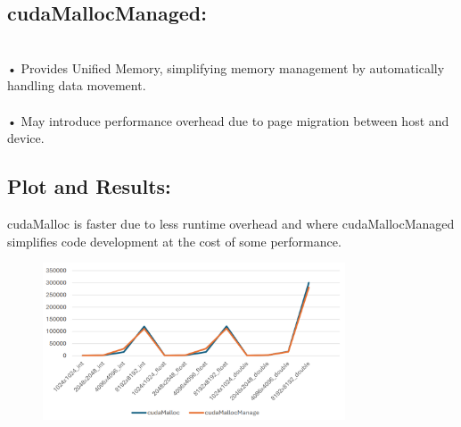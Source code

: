 \documentclass{article}
\begin{document}
\subsection{cudaMallocManaged:}

\\• Provides Unified Memory, simplifying memory management by automatically handling data movement. \\
\\• May introduce performance overhead due to page migration between host and device. \\


\subsection{Plot and Results:}

cudaMalloc is faster due to less runtime overhead and where cudaMallocManaged simplifies code development at the cost of some performance.


\begin{figure}[h!]
    \centering
    \includegraphics[width=0.8\textwidth]{6.png}
\end{figure}
\end{document}

